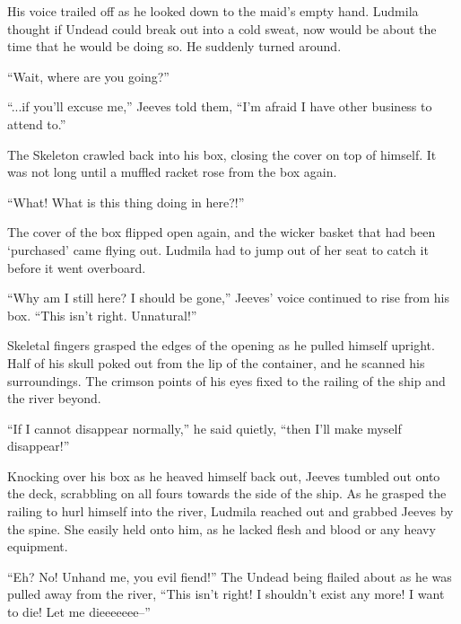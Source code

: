  

His voice trailed off as he looked down to the maid’s empty hand. Ludmila thought if Undead could break out into a cold sweat, now would be about the time that he would be doing so. He suddenly turned around.

 

“Wait, where are you going?”

 

“...if you’ll excuse me,” Jeeves told them, “I’m afraid I have other business to attend to.”

 

The Skeleton crawled back into his box, closing the cover on top of himself. It was not long until a muffled racket rose from the box again.

 

“What! What is this thing doing in here?!”

 

The cover of the box flipped open again, and the wicker basket that had been ‘purchased’ came flying out. Ludmila had to jump out of her seat to catch it before it went overboard.

 

“Why am I still here? I should be gone,” Jeeves’ voice continued to rise from his box. “This isn’t right. Unnatural!”

 

Skeletal fingers grasped the edges of the opening as he pulled himself upright. Half of his skull poked out from the lip of the container, and he scanned his surroundings. The crimson points of his eyes fixed to the railing of the ship and the river beyond.

 

“If I cannot disappear normally,” he said quietly, “then I’ll make myself disappear!”

 

Knocking over his box as he heaved himself back out, Jeeves tumbled out onto the deck, scrabbling on all fours towards the side of the ship. As he grasped the railing to hurl himself into the river, Ludmila reached out and grabbed Jeeves by the spine. She easily held onto him, as he lacked flesh and blood or any heavy equipment.

 

“Eh? No! Unhand me, you evil fiend!” The Undead being flailed about as he was pulled away from the river, “This isn’t right! I shouldn’t exist any more! I want to die! Let me dieeeeeee–”

 

